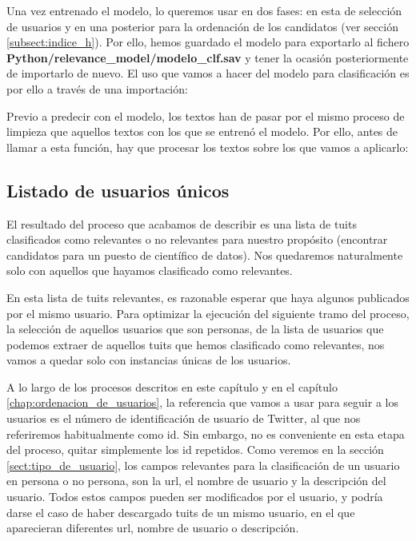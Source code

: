 Una vez entrenado el modelo, lo queremos usar en dos fases: en esta de selección de 
usuarios y en una posterior para la ordenación de los candidatos (ver sección 
\ref{subsect:indice_h}). Por ello, hemos guardado el modelo para 
exportarlo al fichero {\bf Python/relevance\_model/modelo\_clf.sav}
y tener la ocasión posteriormente de importarlo de nuevo. El uso que
vamos a hacer del modelo para clasificación es por ello  a través de 
una importación:


Previo a predecir con el modelo, los textos han de pasar por el mismo proceso de 
limpieza que aquellos textos con los que se entrenó el modelo. Por ello, antes de llamar
a esta función, hay que procesar los textos sobre los que vamos a aplicarlo:


\subsection{Listado de usuarios únicos}
\label{subsect:duplicados1}

El resultado del proceso que acabamos de describir
es una lista de tuits clasificados como relevantes o no relevantes
para nuestro propósito (encontrar candidatos para un puesto de científico de datos).
Nos quedaremos naturalmente solo con aquellos que hayamos clasificado como relevantes.

En esta lista de tuits relevantes, es razonable esperar que haya algunos 
publicados por el mismo usuario. Para optimizar la ejecución
del siguiente tramo del proceso, la selección de aquellos usuarios que son personas, 
de la lista de usuarios que podemos extraer de aquellos tuits que hemos clasificado como
relevantes, nos vamos a quedar solo con instancias únicas de los usuarios.

A lo largo de los procesos descritos en este capítulo y en el capítulo
\ref{chap:ordenacion_de_usuarios},
la referencia que vamos a usar para seguir a los usuarios es el número de identificación 
de usuario de Twitter, al que nos referiremos habitualmente como id.
Sin embargo, no es conveniente en esta etapa del proceso, quitar simplemente los id 
repetidos. Como veremos en la sección \ref{sect:tipo_de_usuario}, los campos relevantes
para la clasificación de un usuario en persona o no persona, son 
la url, el nombre de usuario y la descripción del usuario. Todos estos campos
pueden ser modificados por el usuario, y podría darse el caso de haber descargado
tuits de un mismo usuario, en el que aparecieran diferentes url, nombre de usuario o
descripción.

